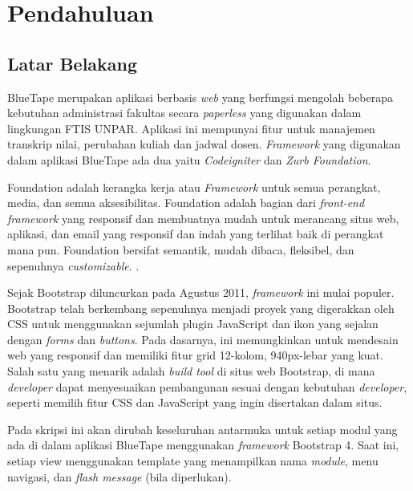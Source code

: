 \chapter{Pendahuluan}
\label{chap:intro}
   
\section{Latar Belakang}
\label{sec:label}


BlueTape merupakan aplikasi berbasis \textit{web} yang berfungsi mengolah beberapa kebutuhan administrasi fakultas secara \textit{paperless} yang digunakan dalam lingkungan FTIS UNPAR.  Aplikasi ini mempunyai fitur untuk manajemen transkrip nilai, perubahan kuliah dan jadwal dosen. \textit{Framework} yang digunakan dalam aplikasi BlueTape ada dua yaitu \textit{Codeigniter} dan \textit{Zurb Foundation}.  \par
Foundation adalah kerangka kerja atau \textit{Framework }  untuk semua perangkat, media, dan semua aksesibilitas. Foundation adalah bagian dari \textit{front-end framework}  yang responsif dan membuatnya mudah untuk merancang situs web, aplikasi, dan email yang responsif dan indah yang terlihat baik di perangkat mana pun. Foundation bersifat semantik, mudah dibaca, fleksibel, dan sepenuhnya \textit{customizable}.
\cite{zurbfoundation:17}.\par
Sejak Bootstrap diluncurkan pada Agustus 2011, \textit{framework} ini mulai populer. Bootstrap telah berkembang sepenuhnya menjadi proyek yang digerakkan oleh CSS untuk menggunakan sejumlah plugin JavaScript dan ikon yang sejalan dengan \textit{forms} dan \textit{buttons}. Pada dasarnya, ini memungkinkan untuk mendesain web yang responsif dan memiliki fitur grid 12-kolom, 940px-lebar yang kuat. Salah satu yang menarik adalah \textit{build tool} di situs web Bootstrap, di mana \textit{developer} dapat menyesuaikan pembangunan sesuai dengan kebutuhan \textit{developer}, seperti memilih fitur CSS dan JavaScript yang ingin disertakan dalam situs. \cite{bootstrap:15:bootstrap}\par
Pada skripsi ini akan dirubah keseluruhan  antarmuka untuk setiap modul yang ada di dalam aplikasi BlueTape menggunakan \textit{framework} Bootstrap 4. Saat ini, setiap view menggunakan template yang menampilkan nama \textit{module}, menu navigasi, dan \textit{flash message} (bila diperlukan).


